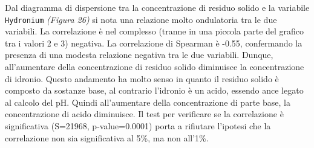 \documentclass{article} %
\begin{document}
Dal diagramma di dispersione tra la concentrazione di residuo solido e la variabile \texttt{Hydronium} \textit{(Figura 26)} si nota una relazione molto ondulatoria tra le due variabili.
La correlazione è nel complesso (tranne in una piccola parte del grafico tra i valori 2 e 3) negativa.
La correlazione di Spearman è -0.55, confermando la presenza di una modesta relazione negativa tra le due variabili. Dunque, all'aumentare della concentrazione di residuo solido diminuisce la concentrazione di idronio.
Questo andamento ha molto senso in quanto il residuo solido è composto da sostanze base, al contrario l'idronio è un acido, essendo ance legato al calcolo del pH. Quindi all'aumentare della concentrazione di parte base, la concentrazione di acido diminuisce.
Il test per verificare se la correlazione è significativa (S=21968, p-value=0.0001) porta a rifiutare l'ipotesi che la correlazione non sia significativa al 5\%, ma non all'1\%.
\end{document}

